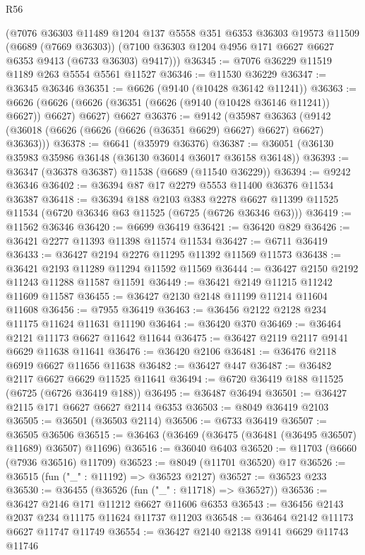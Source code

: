 \begin{lexlean}{R56}
\begin{coremodule}
      (@7076
        @36303
        @11489
        @1204
        @137
        @5558
        @351
        @6353
        @36303
        @19573
        @11509
        (@6689 (@7669 @36303))
        (@7100 @36303 @1204 @4956 @171 @6627 @6627 @6353 @9413 (@6733 @36303) @9417)))
@36345 := @7076 @36229 @11519 @1189 @263 @5554 @5561 @11527
@36346 := @11530 @36229
@36347 := @36345 @36346
@36351 := @6626 (@9140 (@10428 @36142 @11241))
@36363 := @6626
    (@6626 (@6626 (@36351 (@6626 (@9140 (@10428 @36146 @11241)) @6627)) @6627) @6627)
    @6627
@36376 := @9142
    (@35987 @36363 (@9142 (@36018 (@6626 (@6626 (@6626 (@36351 @6629) @6627) @6627) @6627) @36363)))
@36378 := @6641 (@35979 @36376)
@36387 := @36051 (@36130 @35983 @35986 @36148 (@36130 @36014 @36017 @36158 @36148))
@36393 := @36347 (@36378 @36387) @11538 (@6689 (@11540 @36229))
@36394 := @9242 @36346
@36402 := @36394 @87 @17 @2279 @5553 @11400 @36376 @11534 @36387
@36418 := @36394
    @188
    @2103
    @383
    @2278
    @6627
    @11399
    @11525
    @11534
    (@6720 @36346 @63 @11525 (@6725 (@6726 @36346 @63)))
@36419 := @11562 @36346
@36420 := @6699 @36419
@36421 := @36420 @829
@36426 := @36421 @2277 @11393 @11398 @11574 @11534
@36427 := @6711 @36419
@36433 := @36427 @2194 @2276 @11295 @11392 @11569 @11573
@36438 := @36421 @2193 @11289 @11294 @11592 @11569
@36444 := @36427 @2150 @2192 @11243 @11288 @11587 @11591
@36449 := @36421 @2149 @11215 @11242 @11609 @11587
@36455 := @36427 @2130 @2148 @11199 @11214 @11604 @11608
@36456 := @7955 @36419
@36463 := @36456 @2122 @2128 @234 @11175 @11624 @11631 @11190
@36464 := @36420 @370
@36469 := @36464 @2121 @11173 @6627 @11642 @11644
@36475 := @36427 @2119 @2117 @9141 @6629 @11638 @11641
@36476 := @36420 @2106
@36481 := @36476 @2118 @6919 @6627 @11656 @11638
@36482 := @36427 @447
@36487 := @36482 @2117 @6627 @6629 @11525 @11641
@36494 := @6720 @36419 @188 @11525 (@6725 (@6726 @36419 @188))
@36495 := @36487 @36494
@36501 := @36427 @2115 @171 @6627 @6627 @2114 @6353
@36503 := @8049 @36419 @2103
@36505 := @36501 (@36503 @2114)
@36506 := @6733 @36419
@36507 := @36505 @36506
@36515 := @36463 (@36469 (@36475 (@36481 (@36495 @36507) @11689) @36507) @11696)
@36516 := @36040 @6403
@36520 := @11703 (@6660 (@7936 @36516) @11709)
@36523 := @8049 (@11701 @36520) @17
@36526 := @36515 (fun ("_" : @11192) => @36523 @2127)
@36527 := @36523 @233
@36530 := @36455 (@36526 (fun ("_" : @11718) => @36527))
@36536 := @36427 @2146 @171 @11212 @6627 @11606 @6353
@36543 := @36456 @2143 @2037 @234 @11175 @11624 @11737 @11203
@36548 := @36464 @2142 @11173 @6627 @11747 @11749
@36554 := @36427 @2140 @2138 @9141 @6629 @11743 @11746

\end{coremodule}
\end{lexlean}
